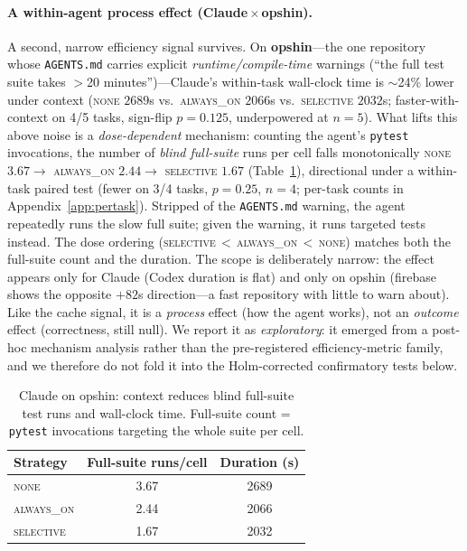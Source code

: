 \documentclass[11pt]{article}
\newcommand{\agentsmd}{\texttt{AGENTS.md}}
\newcommand{\none}{\textsc{none}}
\newcommand{\alwayson}{\textsc{always\_on}}
\newcommand{\selective}{\textsc{selective}}
\begin{document}
\paragraph{A within-agent process effect (Claude\,$\times$\,opshin).}
A second, narrow efficiency signal survives. On \textbf{opshin}---the one repository whose \agentsmd{} carries explicit \emph{runtime/compile-time} warnings (``the full test suite takes $>$20 minutes'')---Claude's within-task wall-clock time is ${\sim}$24\% lower under context (\none{} $2689$s vs.\ \alwayson{} $2066$s vs.\ \selective{} $2032$s; faster-with-context on 4/5 tasks, sign-flip $p{=}0.125$, underpowered at $n{=}5$).
What lifts this above noise is a \emph{dose-dependent} mechanism: counting the agent's \texttt{pytest} invocations, the number of \emph{blind full-suite} runs per cell falls monotonically \none{} $3.67 \to$ \alwayson{} $2.44 \to$ \selective{} $1.67$ (Table~\ref{tab:opshin}), directional under a within-task paired test (fewer on 3/4 tasks, $p{=}0.25$, $n{=}4$; per-task counts in Appendix~\ref{app:pertask}).
Stripped of the \agentsmd{} warning, the agent repeatedly runs the slow full suite; given the warning, it runs targeted tests instead.
The dose ordering (\selective{}\,$<$\,\alwayson{}\,$<$\,\none{}) matches both the full-suite count and the duration.
The scope is deliberately narrow: the effect appears only for Claude (Codex duration is flat) and only on opshin (firebase shows the opposite ${+}82$s direction---a fast repository with little to warn about).
Like the cache signal, it is a \emph{process} effect (how the agent works), not an \emph{outcome} effect (correctness, still null).
We report it as \emph{exploratory}: it emerged from a post-hoc mechanism analysis rather than the pre-registered efficiency-metric family, and we therefore do not fold it into the Holm-corrected confirmatory tests below.

\begin{table}[t]
\centering
\small
\caption{Claude on opshin: context reduces blind full-suite test runs and wall-clock time. Full-suite count = \texttt{pytest} invocations targeting the whole suite per cell.}
\label{tab:opshin}
\begin{tabular}{lcc}
\toprule
\textbf{Strategy} & \textbf{Full-suite runs/cell} & \textbf{Duration (s)} \\
\midrule
\none      & 3.67 & 2689 \\
\alwayson  & 2.44 & 2066 \\
\selective & 1.67 & 2032 \\
\bottomrule
\end{tabular}
\end{table}
\end{document}
